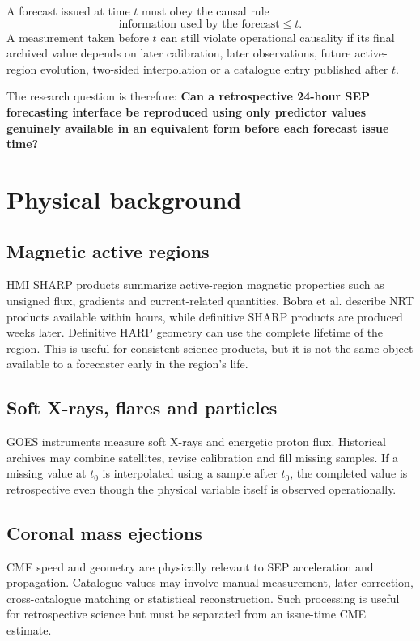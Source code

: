 \documentclass[11pt]{article}
\begin{document}
A forecast issued at time $t$ must obey the causal rule
\begin{equation}\text{information used by the forecast}\leq t.\end{equation}
A measurement taken before $t$ can still violate operational causality if its final archived value depends on later calibration, later observations, future active-region evolution, two-sided interpolation or a catalogue entry published after $t$.

The research question is therefore: \textbf{Can a retrospective 24-hour SEP forecasting interface be reproduced using only predictor values genuinely available in an equivalent form before each forecast issue time?}

\section{Physical background}
\subsection{Magnetic active regions}
HMI SHARP products summarize active-region magnetic properties such as unsigned flux, gradients and current-related quantities. Bobra et al. describe NRT products available within hours, while definitive SHARP products are produced weeks later. Definitive HARP geometry can use the complete lifetime of the region. This is useful for consistent science products, but it is not the same object available to a forecaster early in the region's life.

\subsection{Soft X-rays, flares and particles}
GOES instruments measure soft X-rays and energetic proton flux. Historical archives may combine satellites, revise calibration and fill missing samples. If a missing value at $t_0$ is interpolated using a sample after $t_0$, the completed value is retrospective even though the physical variable itself is observed operationally.

\subsection{Coronal mass ejections}
CME speed and geometry are physically relevant to SEP acceleration and propagation. Catalogue values may involve manual measurement, later correction, cross-catalogue matching or statistical reconstruction. Such processing is useful for retrospective science but must be separated from an issue-time CME estimate.
\end{document}
